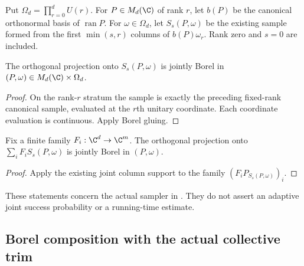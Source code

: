 \begin{definition}
    \label{def:canonical_variable_rank_sample}
    \leanok
    Put $\Omega_d=\prod_{r=0}^d U(r)$. For $P\in M_d(\C)$ of rank $r$,
    let $b(P)$ be the canonical orthonormal basis of $\operatorname{ran}P$.
    For $\omega\in\Omega_d$, let $S_s(P,\omega)$ be the existing sample
    formed from the first $\min(s,r)$ columns of $b(P)\omega_r$.
    Rank zero and $s=0$ are included.
\end{definition}

\begin{lemma}
    \label{lem:borel_variable_rank_sample_projection}
    \leanok
    The orthogonal projection onto $S_s(P,\omega)$ is jointly Borel in
    $(P,\omega)\in M_d(\C)\times\Omega_d$.
\end{lemma}
\begin{proof}\leanok
    On the rank-$r$ stratum the sample is exactly the preceding
    fixed-rank canonical sample, evaluated at the $r$th unitary coordinate.
    Each coordinate evaluation is continuous. Apply Borel gluing.
\end{proof}

\begin{lemma}
    \label{lem:borel_variable_rank_sample_family_image}
    \leanok
    Fix a finite family $F_i:\C^d\to\C^m$. The orthogonal projection onto
    $\sum_iF_iS_s(P,\omega)$ is jointly Borel in $(P,\omega)$.
\end{lemma}
\begin{proof}\leanok
    Apply the existing joint column support to the family
    $(F_iP_{S_s(P,\omega)})_i$.
\end{proof}

These statements concern the actual sampler in
\cite[lines 530--558]{Arad2016RigorousRG}. They do not assert an adaptive
joint success probability or a running-time estimate.

\subsection{Borel composition with the actual collective trim}

